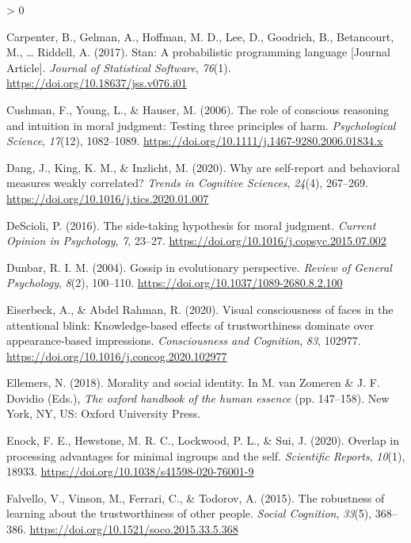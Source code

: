 \documentclass[
  english,
  man]{apa6}
\newlength{\cslhangindent}
\newenvironment{CSLReferences}[2] %
 {%
  \setlength{\parindent}{0pt}
  \ifodd #1 \everypar{\setlength{\hangindent}{\cslhangindent}}\ignorespaces\fi
  \ifnum #2 > 0
  \setlength{\parskip}{#2\baselineskip}
  \fi
 }%
 {}
\begin{document}
\begin{CSLReferences}{1}{0}
\leavevmode\hypertarget{ref-Carpenter_2017_stan}{}%
Carpenter, B., Gelman, A., Hoffman, M. D., Lee, D., Goodrich, B., Betancourt, M., \ldots{} Riddell, A. (2017). Stan: A probabilistic programming language {[}Journal Article{]}. \emph{Journal of Statistical Software}, \emph{76}(1). \url{https://doi.org/10.18637/jss.v076.i01}

\leavevmode\hypertarget{ref-cushman_role_2006}{}%
Cushman, F., Young, L., \& Hauser, M. (2006). The role of conscious reasoning and intuition in moral judgment: Testing three principles of harm. \emph{Psychological Science}, \emph{17}(12), 1082--1089. \url{https://doi.org/10.1111/j.1467-9280.2006.01834.x}

\leavevmode\hypertarget{ref-dang_why_2020}{}%
Dang, J., King, K. M., \& Inzlicht, M. (2020). Why are self-report and behavioral measures weakly correlated? \emph{Trends in Cognitive Sciences}, \emph{24}(4), 267--269. \url{https://doi.org/10.1016/j.tics.2020.01.007}

\leavevmode\hypertarget{ref-descioli_side-taking_2016}{}%
DeScioli, P. (2016). The side-taking hypothesis for moral judgment. \emph{Current Opinion in Psychology}, \emph{7}, 23--27. \url{https://doi.org/10.1016/j.copsyc.2015.07.002}

\leavevmode\hypertarget{ref-dunbar_gossip_2004}{}%
Dunbar, R. I. M. (2004). Gossip in evolutionary perspective. \emph{Review of General Psychology}, \emph{8}(2), 100--110. \url{https://doi.org/10.1037/1089-2680.8.2.100}

\leavevmode\hypertarget{ref-eiserbeck_visual_2020}{}%
Eiserbeck, A., \& Abdel Rahman, R. (2020). Visual consciousness of faces in the attentional blink: Knowledge-based effects of trustworthiness dominate over appearance-based impressions. \emph{Consciousness and Cognition}, \emph{83}, 102977. \url{https://doi.org/10.1016/j.concog.2020.102977}

\leavevmode\hypertarget{ref-ellemers_morality_2018}{}%
Ellemers, N. (2018). Morality and social identity. In M. van Zomeren \& J. F. Dovidio (Eds.), \emph{The oxford handbook of the human essence} (pp. 147--158). New York, {NY}, {US}: Oxford University Press.

\leavevmode\hypertarget{ref-enock_overlap_2020}{}%
Enock, F. E., Hewstone, M. R. C., Lockwood, P. L., \& Sui, J. (2020). Overlap in processing advantages for minimal ingroups and the self. \emph{Scientific Reports}, \emph{10}(1), 18933. \url{https://doi.org/10.1038/s41598-020-76001-9}

\leavevmode\hypertarget{ref-falvello_robustness_2015}{}%
Falvello, V., Vinson, M., Ferrari, C., \& Todorov, A. (2015). The robustness of learning about the trustworthiness of other people. \emph{Social Cognition}, \emph{33}(5), 368--386. \url{https://doi.org/10.1521/soco.2015.33.5.368}


\end{CSLReferences}
\end{document}
